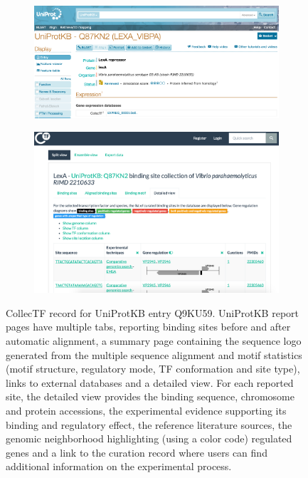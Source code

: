 \begin{figure}
  \centering
  \begin{subfigure}{0.7\textwidth}
    \includegraphics[width=1\textwidth]{figures/chapter2/uniprot}
  \end{subfigure}

  \begin{subfigure}{0.7\textwidth}
    \includegraphics[width=1\textwidth]{figures/chapter2/protein-record}
  \end{subfigure}

  \caption{CollecTF record for UniProtKB entry Q9KU59.  UniProtKB report pages
    have multiple tabs, reporting binding sites before and after automatic
    alignment, a summary page containing the sequence logo generated from the
    multiple sequence alignment and motif statistics (motif structure,
    regulatory mode, TF conformation and site type), links to external
    databases and a detailed view. For each reported site, the detailed view
    provides the binding sequence, chromosome and protein accessions, the
    experimental evidence supporting its binding and regulatory effect, the
    reference literature sources, the genomic neighborhood highlighting (using
    a color code) regulated genes and a link to the curation record where users
    can find additional information on the experimental process.}
\label{fig:uniprot-integration}
\end{figure}

